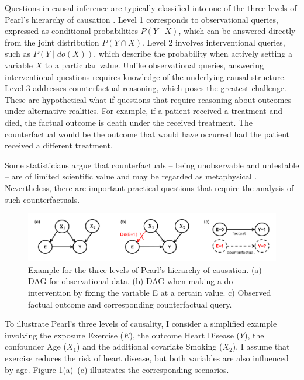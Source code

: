 Questions in causal inference are typically classified into one of the three levels of Pearl's hierarchy of causation \citep{pearl_book2009}. Level 1 corresponds to observational queries, expressed as conditional probabilities $P(Y \mid X)$, which can be answered directly from the joint distribution $P(Y \cap X)$. Level 2 involves interventional queries, such as $P(Y \mid do(X))$, which describe the probability when actively setting a variable $X$ to a particular value. Unlike observational queries, answering interventional questions requires knowledge of the underlying causal structure. Level 3 addresses counterfactual reasoning, which poses the greatest challenge. These are hypothetical what-if questions that require reasoning about outcomes under alternative realities. For example, if a patient received a treatment and died, the factual outcome is death under the received treatment. The counterfactual would be the outcome that would have occurred had the patient received a different treatment.

 
Some statisticians argue that counterfactuals -- being unobservable and untestable -- are of limited scientific value and may be regarded as metaphysical \citep{dawid2000}. Nevertheless, there are important practical questions that require the analysis of such counterfactuals.



\begin{figure}[H]
\centering
\includegraphics[width=1\textwidth]{img/pearl_levels.png}
\caption{Example for the three levels of Pearl's hierarchy of causation. (a) DAG for observational data. (b) DAG when making a do-intervention by fixing the variable E at a certain value. c) Observed factual outcome and corresponding counterfactual query.}
\label{fig:pearl_levels}
\end{figure}


To illustrate Pearl's three levels of causality, I consider a simplified example involving the exposure Exercise ($E$), the outcome Heart Disease ($Y$), the confounder Age ($X_1$) and the additional covariate Smoking ($X_2$). I assume that exercise reduces the risk of heart disease, but both variables are also influenced by age. Figure \ref{fig:pearl_levels}(a)--(c) illustrates the corresponding scenarios.





